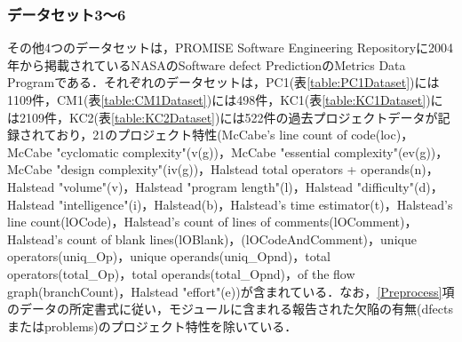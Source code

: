 \subsubsection{データセット3～6}
その他4つのデータセットは，PROMISE Software Engineering Repository\cite{PROMISEdataset}に2004年から掲載されているNASAのSoftware defect PredictionのMetrics Data Programである．それぞれのデータセットは，PC1(表\ref{table:PC1Dataset})には1109件，CM1(表\ref{table:CM1Dataset})には498件，KC1(表\ref{table:KC1Dataset})には2109件，KC2(表\ref{table:KC2Dataset})には522件の過去プロジェクトデータが記録されており，21のプロジェクト特性(McCabe's line count of code(loc)，McCabe "cyclomatic complexity"(v(g))，McCabe "essential complexity"(ev(g))，McCabe "design complexity"(iv(g))，Halstead total operators + operands(n)，Halstead "volume"(v)，Halstead "program length"(l)，Halstead "difficulty"(d)，Halstead "intelligence"(i)，Halstead(b)，Halstead's time estimator(t)，Halstead's line count(lOCode)，Halstead's count of lines of comments(lOComment)，Halstead's count of blank lines(lOBlank)，(lOCodeAndComment)，unique operators(uniq\_Op)，unique operands(uniq\_Opnd)，total operators(total\_Op)，total operands(total\_Opnd)，of the flow graph(branchCount)，Halstead "effort"(e))が含まれている．なお，\ref{Preprocess}項のデータの所定書式に従い，モジュールに含まれる報告された欠陥の有無(dfectsまたはproblems)のプロジェクト特性を除いている．

\begin{table*}[ht]
  \centering
  \captionsetup{labelformat=empty} %
  \caption{}
  \label{table:PC1Dataset}
  \begin{center}
  \end{center}
\end{table*}

